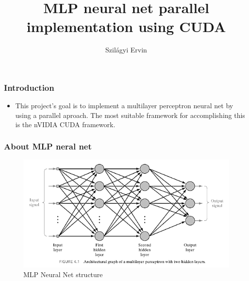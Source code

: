 \documentclass{beamer}
\title{MLP neural net parallel implementation using CUDA}
\author[Szilagyi Ervin]{Szil\'{a}gyi Ervin}
\institute{Sapientia EMTE}
\begin{document}
	\begin{frame}
		\titlepage
	\end{frame}
	
	\begin{frame}
		\frametitle{Introduction}
		\begin{itemize}
			\item This project's goal is to implement a multilayer perceptron neural net by using a parallel aproach. The most suitable framework for accomplishing this is the nVIDIA CUDA framework. 
		\end{itemize}
	\end{frame}

	\begin{frame}
		\frametitle{About MLP neral net}
		\begin{figure}
			\centering
			\includegraphics[scale=0.8]{mlp_structure}
			\caption{MLP Neural Net structure}
		\end{figure} 
	\end{frame} 
\end{document}
